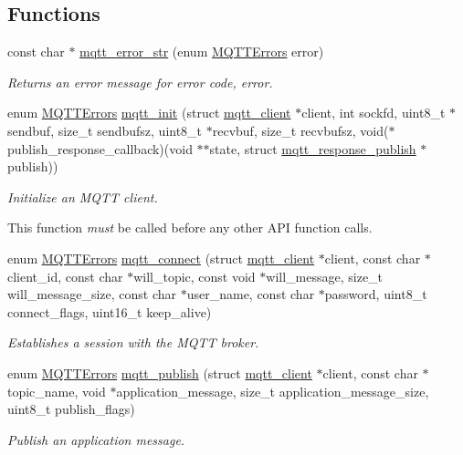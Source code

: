 \subsection*{Functions}
\begin{DoxyCompactItemize}
\item 
const char $\ast$ \hyperlink{group__api_ga47b62bdd24e8b05957825d2419d7c848}{mqtt\+\_\+error\+\_\+str} (enum \hyperlink{group__api_gad0c901a8d30691ed0ca17915b691b7e7}{M\+Q\+T\+T\+Errors} error)
\begin{DoxyCompactList}\small\item\em Returns an error message for error code, {\ttfamily error}. \end{DoxyCompactList}\item 
enum \hyperlink{group__api_gad0c901a8d30691ed0ca17915b691b7e7}{M\+Q\+T\+T\+Errors} \hyperlink{group__api_gab07105b049dd86a8ec39c518cf9fa4c7}{mqtt\+\_\+init} (struct \hyperlink{structmqtt__client}{mqtt\+\_\+client} $\ast$client, int sockfd, uint8\+\_\+t $\ast$sendbuf, size\+\_\+t sendbufsz, uint8\+\_\+t $\ast$recvbuf, size\+\_\+t recvbufsz, void($\ast$publish\+\_\+response\+\_\+callback)(void $\ast$$\ast$state, struct \hyperlink{structmqtt__response__publish}{mqtt\+\_\+response\+\_\+publish} $\ast$publish))
\begin{DoxyCompactList}\small\item\em Initialize an M\+Q\+TT client.

This function {\itshape must} be called before any other A\+PI function calls. \end{DoxyCompactList}\item 
enum \hyperlink{group__api_gad0c901a8d30691ed0ca17915b691b7e7}{M\+Q\+T\+T\+Errors} \hyperlink{group__api_gadbe914e5a9d4f93314c4e7637cb4f7b3}{mqtt\+\_\+connect} (struct \hyperlink{structmqtt__client}{mqtt\+\_\+client} $\ast$client, const char $\ast$client\+\_\+id, const char $\ast$will\+\_\+topic, const void $\ast$will\+\_\+message, size\+\_\+t will\+\_\+message\+\_\+size, const char $\ast$user\+\_\+name, const char $\ast$password, uint8\+\_\+t connect\+\_\+flags, uint16\+\_\+t keep\+\_\+alive)
\begin{DoxyCompactList}\small\item\em Establishes a session with the M\+Q\+TT broker. \end{DoxyCompactList}\item 
enum \hyperlink{group__api_gad0c901a8d30691ed0ca17915b691b7e7}{M\+Q\+T\+T\+Errors} \hyperlink{group__api_ga0d8fed24a799ab9b55eeb28f3cd2d0a8}{mqtt\+\_\+publish} (struct \hyperlink{structmqtt__client}{mqtt\+\_\+client} $\ast$client, const char $\ast$topic\+\_\+name, void $\ast$application\+\_\+message, size\+\_\+t application\+\_\+message\+\_\+size, uint8\+\_\+t publish\+\_\+flags)
\begin{DoxyCompactList}\small\item\em Publish an application message.


\end{DoxyCompactList}
\end{DoxyCompactItemize}
